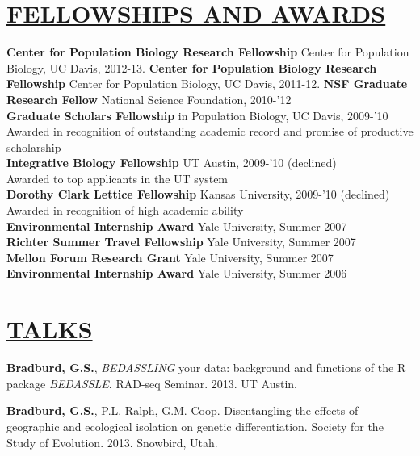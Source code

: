 \documentclass{res}
\begin{document}
\begin{resume}
\section{\underline{FELLOWSHIPS AND AWARDS}}
\textbf{Center for Population Biology Research Fellowship} Center for Population Biology, UC Davis, 2012-13.
\textbf{Center for Population Biology Research Fellowship} Center for Population Biology, UC Davis, 2011-12.
\textbf{NSF Graduate Research Fellow} National Science Foundation, 2010-'12\\ \vspace{0.3mm}
\textbf{Graduate Scholars Fellowship} in Population Biology, UC Davis, 2009-'10\\ \vspace{0.3mm}
\hspace{4.5mm}Awarded in recognition of outstanding academic record and promise of productive scholarship\\
\textbf{Integrative Biology Fellowship} UT Austin, 2009-'10 (declined)\\ \vspace{0.3mm}
\hspace{4.5mm}Awarded to top applicants in the UT system\\
\textbf{Dorothy Clark Lettice Fellowship} Kansas University, 2009-'10 (declined)\\  \vspace{0.3mm}
\hspace{4.5mm}Awarded in recognition of high academic ability\\
\textbf{Environmental Internship Award} Yale University, Summer 2007\\ 
\textbf{Richter Summer Travel Fellowship} Yale University, Summer 2007\\
\textbf{Mellon Forum Research Grant} Yale University, Summer 2007\\
\textbf{Environmental Internship Award} Yale University, Summer 2006\\

\section{\underline{TALKS}}
\textbf{Bradburd, G.S.}, \textit{BEDASSLING} your data: background and functions of the R package \textit{BEDASSLE}.  RAD-seq Seminar. 2013. UT Austin.

\textbf{Bradburd, G.S.}, P.L. Ralph, G.M. Coop.   Disentangling the effects of geographic and ecological isolation on genetic differentiation.  Society for the Study of Evolution. 2013. Snowbird, Utah.\


\end{resume}
\end{document}
